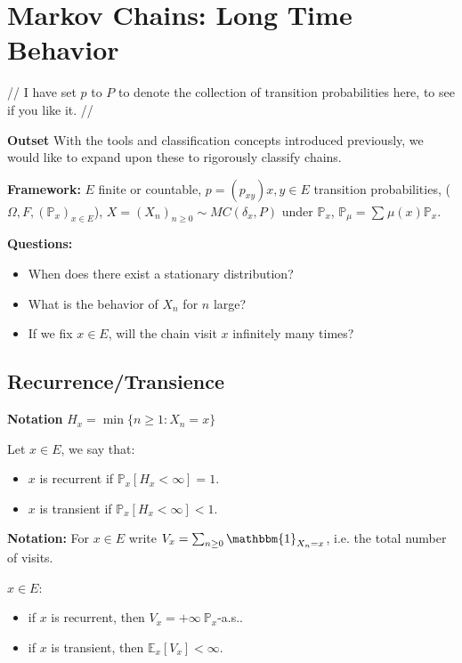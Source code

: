 \chapter{Markov Chains: Long Time Behavior}
{\color{blue} // I have set $p$ to $P$ to denote the collection of transition probabilities here, to see if you like it. //}

\noindent \textbf{Outset} With the tools and classification concepts introduced previously, we would like to expand upon these to rigorously classify chains.

\noindent \textbf{Framework:} $E$ finite or countable, $p=(p_{xy})x,y \in E$ transition probabilities, ($\Omega, F, (\mathbb{P}_x) _{x \in E}$), $X=(X_n)_{n\geq 0} \sim MC(\delta_x,P)$ under $\mathbb{P}_x$, $\mathbb{P}_\mu = \sum_{}^{} \mu (x)\mathbb{P}_x$.

\noindent \textbf{Questions:} 
\begin{itemize}
	\item When does there exist a stationary distribution?
	\item What is the behavior of $X_n$ for $n$ large?
	\item If we fix $x \in E$, will the chain visit $x$ infinitely many times?
\end{itemize}

\section{Recurrence/Transience}

\textbf{Notation} $H_x = \min\{n\geq 1: X_n=x\}$
\begin{defn}
	Let $x \in E$, we say that:
\begin{itemize}
	\item $x$ is recurrent if $\boxed{\mathbb{P}_{x} \left[ H_x<\infty \right]=1 }$.
	\item $x$ is transient if $\boxed{\mathbb{P}_{x} \left[ H_x<\infty \right] <1}$.
\end{itemize}

\end{defn}
\noindent
\textbf{Notation:} For $x \in E$ write $V_x=\sum_{n\geq 0}^{} \mathbbm{1}_{X_n=x} $, i.e. the total number of visits.

\begin{theorem}
	$x \in E$:
\begin{itemize}
	\item if $x$ is recurrent, then $\boxed{V_{x}=+\infty} \ \mathbb{P}_x$-a.s..
	\item if $x$ is transient, then $\boxed{\mathbb{E}_{x} \left[ V_x \right] <\infty}$.
\end{itemize}
\end{theorem}


